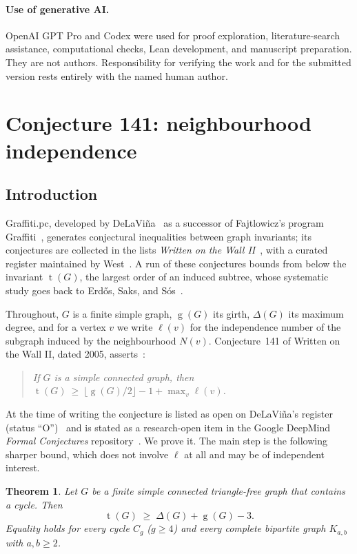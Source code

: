 \documentclass[11pt]{article}
\numberwithin{equation}{section}
\newtheorem{theorem}{Theorem}[section]
\theoremstyle{remark}
\newcommand{\tr}{\operatorname{t}}
\newcommand{\gr}{\operatorname{g}}
\newcommand{\lv}{\ell}
\begin{document}
\paragraph{Use of generative AI.}
OpenAI GPT Pro and Codex were used for proof exploration, literature-search
assistance, computational checks, Lean development, and manuscript
preparation.  They are not authors.  Responsibility for verifying the work
and for the submitted version rests entirely with the named human author.

\section{Conjecture 141: neighbourhood independence}
\subsection{Introduction}

Graffiti.pc, developed by DeLaVi\~na~\cite{DeL01,DeLhistory} as a successor of
Fajtlowicz's program Graffiti~\cite{Faj88}, generates conjectural inequalities
between graph invariants; its conjectures are collected in the lists
\emph{Written on the Wall II}~\cite{WOWII}, with a curated register maintained
by West~\cite{WestReg}.  A run of these conjectures bounds from below the
invariant $\tr(G)$, the largest order of an induced subtree, whose systematic
study goes back to Erd\H{o}s, Saks, and S\'os~\cite{ESS86}.

Throughout, $G$ is a finite simple graph, $\gr(G)$ its girth, $\Delta(G)$ its
maximum degree, and for a vertex $v$ we write
$\lv(v)$ for the independence number of the subgraph induced by the
neighbourhood $N(v)$.  Conjecture~141 of Written on the Wall II, dated 2005,
asserts~\cite{WOWII}:

\begin{quote}
\emph{If $G$ is a simple connected graph, then
$\tr(G)\ \ge\ \lfloor \gr(G)/2\rfloor - 1 + \max_v \lv(v)$.}
\end{quote}

At the time of writing the conjecture is listed as open on DeLaVi\~na's
register (status ``O'')~\cite{WOWII} and is stated as a research-open item in
the Google DeepMind \emph{Formal Conjectures} repository~\cite{FC,FC141}.  We
prove it.
The main step is the following sharper bound, which does not involve
$\lv$ at all and may be of independent interest.

\begin{theorem}\label{w141-thm:main}
Let $G$ be a finite simple connected triangle-free graph that contains a
cycle.  Then
\[
  \tr(G)\;\ge\;\Delta(G)+\gr(G)-3 .
\]
Equality holds for every cycle $C_g$ ($g\ge4$) and every complete bipartite
graph $K_{a,b}$ with $a,b\ge2$.
\end{theorem}
\end{document}
